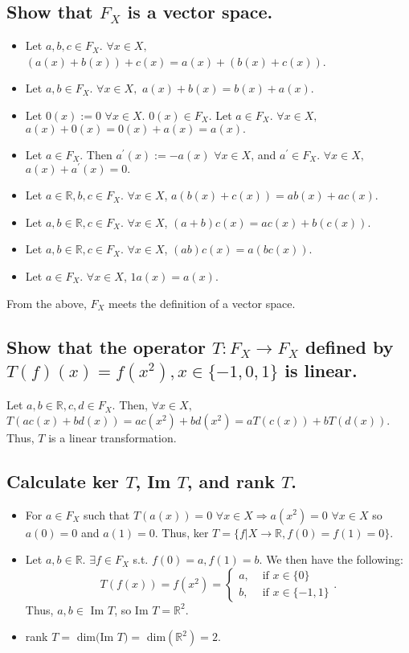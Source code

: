 \documentclass[11pt]{article} %
\begin{document}
\subsection{Show that $F_X$ is a vector space.}
\begin{itemize}
\item
Let $a,b,c \in F_X$. $\forall x \in X,$ $(a(x) + b(x)) +c(x) = a(x) + (b(x) +c(x))$.
\item
Let $a,b \in F_X$. $\forall x \in X,$ $a(x) + b(x) =  b(x) + a(x)$. 
\item
Let $0(x):= 0$  $\forall x \in X$. $0(x) \in F_X.$ Let $a \in F_X$.  $\forall x \in X,$ $a(x) + 0(x) = 0(x) + a(x) = a(x).$
\item
Let $a \in F_X$. Then $a^{'}(x):= -a(x)$ $\forall x \in X$, and $a^{'} \in F_X$.  $\forall x \in X,$  $a(x) + a^{'}(x) = 0.$
\item
Let $a \in \mathbb{R}, b,c \in F_X.$ $\forall x \in X$, $a (b(x) + c(x)) = ab(x) + ac(x).$
\item
Let $a,b \in \mathbb{R}, c \in F_X.$ $\forall x \in X$, $(a+b)c(x) = ac(x) + b(c(x)).$
\item
Let $a,b \in \mathbb{R}, c \in F_X.$ $\forall x \in X$, $(ab)c(x) = a(bc(x)).$
\item
Let $a \in F_X$. $\forall x \in X$, $1 a(x) = a(x)$.
\end{itemize}
From the above, $F_X$ meets the definition of a vector space.
\subsection{Show that the operator $T: F_X \rightarrow F_X$ defined by $T(f)(x) = f(x^2), x \in \{ -1,0,1\}$ is linear.}
Let $a,b \in \mathbb{R}, c,d \in F_X.$ Then, $\forall x \in X,$ $T(ac(x) + bd(x)) = ac(x^2) + bd(x^2) = aT(c(x)) + bT(d(x)).$ Thus, $T$ is a linear transformation.
\subsection{Calculate ker $T$, Im $T$, and rank $T$.}
\begin{itemize}
\item
For $a \in F_X$ such that $T(a(x)) = 0$ $\forall x \in X \Rightarrow a(x^2) = 0$ $\forall x \in X$ so  $a(0) = 0$ and $a(1) = 0.$ Thus, ker $ T = \{f|X \rightarrow \mathbb{R}, f(0) = f(1) = 0\}$.
\item
Let $a,b \in \mathbb{R}.$ $\exists f \in F_X$ s.t. $f(0) = a, f(1) = b$. We then have the following:
\begin{equation*}
T(f(x)) = f(x^2) = 
\begin{cases}
a,& \text{ if } x \in \{ 0\} \\
b,& \text{ if } x \in \{ -1,1\}
\end{cases}.
\end{equation*} 
Thus, $a,b \in$ Im $T$, so Im $T = \mathbb{R}^2$.
\item
rank $T = $ dim$($Im $T) = $ dim$(\mathbb{R}^2) = 2.$ 
\end{itemize}
\end{document}
